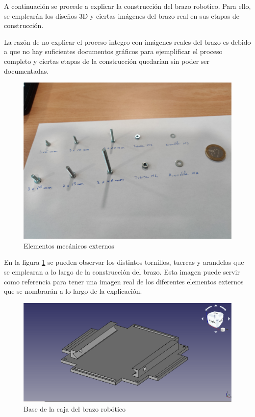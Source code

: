 A continuación se procede a explicar la construcción del brazo robotico. Para ello, se emplearán los diseños 3D y ciertas imágenes del brazo real en sus etapas de construcción.

La razón de no explicar el proceso integro con imágenes reales del brazo es debido a que no hay suficientes documentos gráficos para ejemplificar el proceso completo y ciertas etapas de la construcción quedarían sin poder ser documentadas.

\begin{figure}[H]
    \centering 
    \includegraphics[width=1\linewidth]{pictures/ElementosMecanicosExternos.jpg}
    \caption{Elementos mecánicos externos}
    \label{fig:elementos_mecanicos_externos}
\end{figure}

En la figura \ref{fig:elementos_mecanicos_externos} se pueden observar los distintos tornillos, tuercas y arandelas que se emplearan a lo largo de la construcción del brazo. Esta imagen puede servir como referencia para tener una imagen real de los diferentes elementos externos que se nombrarán a lo largo de la explicación.

\begin{figure}[H]
    \centering 
    \includegraphics[width=1\linewidth]{pictures/BaseDelBrazoRobotico.png}
    \caption{Base de la caja del brazo robótico}
    \label{fig:base_caja_brazo_robotico}
\end{figure}

